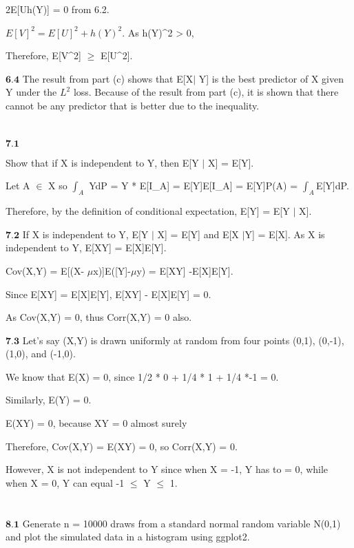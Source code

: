 2E[Uh(Y)] = 0 from 6.2.

$E[V]^2 = E[U]^2 + h(Y)^2.$ As h(Y)^2 > 0, 

Therefore, E[V^2] $\geq$ E[U^2].

$\textbf{6.4}$ The result from part (c) shows that E[X$\mid$ Y] is the best predictor of X given Y under the $L^2$ loss. Because of the result from part (c), it is shown that there cannot be any predictor that is better due to the inequality.

\newpage
\section{}

$\textbf{7.1}$

Show that if X is independent to Y, then E[Y $\mid$ X] = E[Y].

Let A $\in$ X so $\int_{A}$ YdP = Y * E[I_{A}] = E[Y]E[I_{A}] = E[Y]P(A) = $\int_{A}$E[Y]dP. 

Therefore, by the definition of conditional expectation, E[Y] = E[Y $\mid$ X].

$\textbf{7.2}$ If X is independent to Y, E[Y $\mid$ X] = E[Y] and E[X $\mid $Y] = E[X]. 
As X is independent to Y, E[XY] = E[X]E[Y]. 

Cov(X,Y) = E[(X- $\mu$x)]E([Y]-$\mu$y) = E[XY] -E[X]E[Y].

Since E[XY] = E[X]E[Y], E[XY] - E[X]E[Y] = 0.

As Cov(X,Y) = 0, thus Corr(X,Y) = 0 also.

$\textbf{7.3}$ Let's say (X,Y) is drawn uniformly at random from four points (0,1), (0,-1), (1,0), and (-1,0).

We know that E(X) = 0, since 1/2 * 0 + 1/4 * 1 + 1/4 *-1 = 0.

Similarly, E(Y) = 0.

E(XY) = 0, because XY = 0 almost surely

Therefore, Cov(X,Y) = E(XY) = 0, so Corr(X,Y) = 0.

However, X is not independent to Y since when X = -1, Y has to = 0, while when X = 0, Y can equal -1 $\leq$ Y $\leq$ 1.

\newpage
\section{}

$\textbf{8.1}$ Generate n = 10000 draws from a standard normal random variable N(0,1) and plot the simulated data in a histogram using ggplot2.

